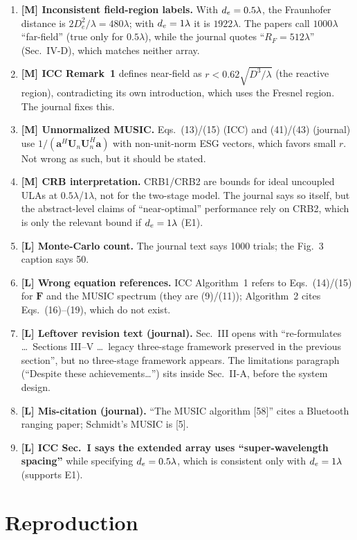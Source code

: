 \documentclass[11pt,a4paper]{article}
\begin{document}
\begin{enumerate}[label=\textbf{E\arabic*}]
\item \textbf{[M] Inconsistent field-region labels.} With $d_e=0.5\lambda$, the Fraunhofer distance is $2D_e^2/\lambda=480\lambda$;
with $d_e=1\lambda$ it is $1922\lambda$. The papers call $1000\lambda$ ``far-field'' (true only for $0.5\lambda$),
while the journal quotes ``$R_F=512\lambda$'' (Sec.~IV-D), which matches neither array.
\item \textbf{[M] ICC Remark~1} defines near-field as $r<0.62\sqrt{D^3/\lambda}$ (the reactive region),
contradicting its own introduction, which uses the Fresnel region. The journal fixes this.
\item \textbf{[M] Unnormalized MUSIC.} Eqs.~(13)/(15) (ICC) and (41)/(43) (journal) use
$1/(\mathbf a^H\mathbf U_n\mathbf U_n^H\mathbf a)$ with non-unit-norm ESG vectors, which favors small $r$.
Not wrong as such, but it should be stated.
\item \textbf{[M] CRB interpretation.} CRB1/CRB2 are bounds for ideal uncoupled ULAs at $0.5\lambda$/$1\lambda$, not for the
two-stage model. The journal says so itself, but the abstract-level claims of ``near-optimal'' performance rely on CRB2,
which is only the relevant bound if $d_e=1\lambda$ (E1).
\item \textbf{[L] Monte-Carlo count.} The journal text says 1000 trials; the Fig.~3 caption says 50.
\item \textbf{[L] Wrong equation references.} ICC Algorithm~1 refers to Eqs.~(14)/(15) for $\mathbf F$ and the MUSIC spectrum
(they are (9)/(11)); Algorithm~2 cites Eqs.~(16)--(19), which do not exist.
\item \textbf{[L] Leftover revision text (journal).} Sec.~III opens with ``re-formulates \ldots\ Sections III--V \ldots\ legacy
three-stage framework preserved in the previous section'', but no three-stage framework appears. The limitations
paragraph (``Despite these achievements\ldots'') sits inside Sec.~II-A, before the system design.
\item \textbf{[L] Mis-citation (journal).} ``The MUSIC algorithm [58]'' cites a Bluetooth ranging paper; Schmidt's MUSIC is [5].
\item \textbf{[L] ICC Sec.~I says the extended array uses ``super-wavelength spacing''} while specifying $d_e=0.5\lambda$, which is
consistent only with $d_e=1\lambda$ (supports E1).
\end{enumerate}

\section{Reproduction}\label{sec:repro}
\end{document}
